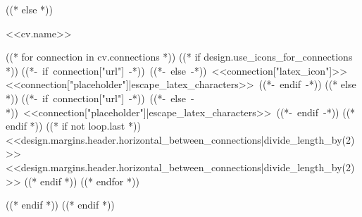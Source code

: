         \vspace{10pt}
    ((* else *))
        \begin{header}
            \fontsize{<<design.header_font_size>>}{<<design.header_font_size>>}\selectfont <<cv.name>>

            \vspace{<<design.margins.header.vertical_between_name_and_connections>>}

            \normalsize
            ((* for connection in cv.connections *))
                ((* if design.use_icons_for_connections *))
            \mbox{((*- if connection["url"] -*))
                ((*- else -*))
                {\footnotesize<<connection["latex_icon"]>>}\hspace*{0.13cm}<<connection["placeholder"]|escape_latex_characters>>
                ((*- endif -*))}%
                ((* else *))
            \mbox{((*- if connection["url"] -*))
                ((*- else -*))
                <<connection["placeholder"]|escape_latex_characters>>
                ((*- endif -*))}%
                ((* endif *))
                ((* if not loop.last *))
            \kern <<design.margins.header.horizontal_between_connections|divide_length_by(2)>>%
            \AND%
            \kern <<design.margins.header.horizontal_between_connections|divide_length_by(2)>>%
                ((* endif *))
            ((* endfor *))
        \end{header}
    ((* endif *))
\vspace{<<design.margins.header.bottom>> - <<design.margins.section_title.top>>}
((* endif *))